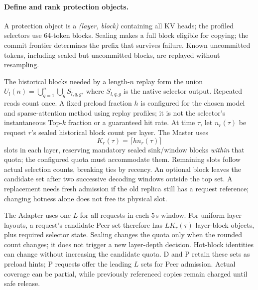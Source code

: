 \paragraph{Define and rank protection objects.}
A protection object is a \emph{(layer, block)} containing all KV heads;
the profiled selectors use 64-token blocks. Sealing makes a full block
eligible for copying; the commit frontier determines the prefix that
survives failure. Known uncommitted tokens, including sealed but
uncommitted blocks, are replayed without resampling.

The historical blocks needed by a length-$n$ replay form the union
$U_l(n)=\bigcup_{q=1}^{n}\bigcup_g S_{l,q,g}$, where $S_{l,q,g}$ is the
native selector output. Repeated reads count once. A fixed preload
fraction $h$ is configured for the chosen model and sparse-attention
method using replay profiles; it is not the selector's instantaneous
Top-$k$ fraction or a guaranteed hit rate. At time $\tau$, let $n_r(\tau)$
be request $r$'s sealed historical block count per layer. The Master uses
\begin{equation}
 K_r(\tau)=\lceil h n_r(\tau)\rceil
 \label{eq:hot-block-count}
\end{equation}
slots in each layer, reserving mandatory sealed sink/window blocks
\emph{within} that quota; the configured quota must accommodate them.
Remaining slots follow actual selection counts, breaking ties by recency.
An optional block leaves the candidate set after two successive decoding
windows outside the top set. A replacement needs fresh admission if
the old replica still has a request reference; changing hotness alone
does not free its physical slot.

The Adapter uses one $L$ for all requests in each 5\,s window. For
uniform layer layouts, a request's candidate Peer set therefore has
$LK_r(\tau)$ layer-block objects, plus required selector state.
Sealing changes the quota only when the rounded count changes; it does
not trigger a new layer-depth decision. Hot-block identities can change
without increasing the candidate quota. D and P retain these sets as
preload hints; P requests offer the leading $L$ sets for Peer admission.
Actual coverage can be partial, while previously referenced copies
remain charged until safe release.

